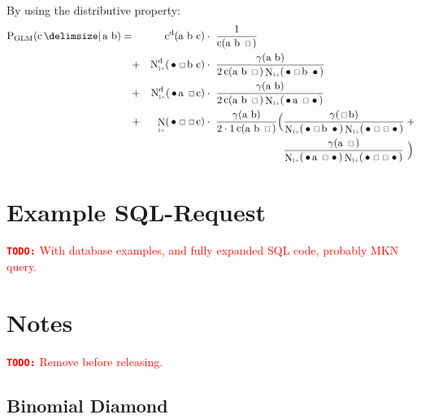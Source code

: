 \documentclass[m,bachelor,binding,palatino]{WeSTthesis}
\newcommand*{\Scale}[2][4]{\scalebox{#1}{$#2$}}%
\DeclareMathOperator{\Count}{c}
\DeclareMathOperator{\ContCount}{N}
\newcommand{\ContCountIp}  {\ContCount_{\Scale[0.5]{1+}}}
\newcommand{\Skp}{\ensuremath{\,\Scale[0.7]{\square}\,}}
\newcommand{\WSkp}{\ensuremath{\,\bullet\,}}
\newcommand{\todo}[1]{\textcolor{red}{{\footnotesize\textbf{\texttt{TODO:}}} #1}}
\begin{document}
{\begin{appendices}
By using the distributive property:
\begin{align}
  \ProbGLM {\text{c}}{\text{a b}} =
    & & \DiscountedCount (\text{a b c})          &             \cdot\  \frac{1}{\Count(\text{a b \Skp})} \\
    &+& \DiscountedCount*(\text{\WSkp \Skp b c}) &             \cdot\  \frac{\gamma(\text{a b})}{2 \Count(\text{a b \Skp}) \ContCountIp(\text{\WSkp \Skp b \WSkp})} \nonumber \\
    &+& \DiscountedCount*(\text{\WSkp a \Skp c}) &             \cdot\  \frac{\gamma(\text{a b})}{2 \Count(\text{a b \Skp}) \ContCountIp(\text{\WSkp a \Skp \WSkp})} \nonumber \\
    &+& \ContCountIp(\text{\WSkp\Skp \Skp c})    &             \cdot\  \frac{\gamma(\text{a b})}{2 \cdot 1 \Count(\text{a b \Skp})} \Big(  \frac{\gamma(\text{\Skp b})}{\ContCountIp(\text{\WSkp \Skp b \WSkp}) \ContCountIp(\text{\WSkp \Skp \Skp \WSkp})} \: + \nonumber \\
    & &                                          & \phantom{{} \cdot\  \frac{\gamma(\text{a b})}{2 \cdot 1 \Count(\text{a b \Skp})} \Big(} \frac{\gamma(\text{a \Skp})}{\ContCountIp(\text{\WSkp a \Skp \WSkp}) \ContCountIp(\text{\WSkp \Skp \Skp \WSkp})} \ \Big) \nonumber
\end{align}

\chapter{Example SQL-Request}
\label{app:sql-example}

\todo{With database examples, and fully expanded SQL code, probably MKN query.}

\chapter{Notes}

\todo{Remove before releasing.}

\begin{landscape}
  \section{Binomial Diamond}
  \begin{figure}[H]
    \centering
\end{figure}
\end{landscape}
\end{appendices}}
\end{document}
